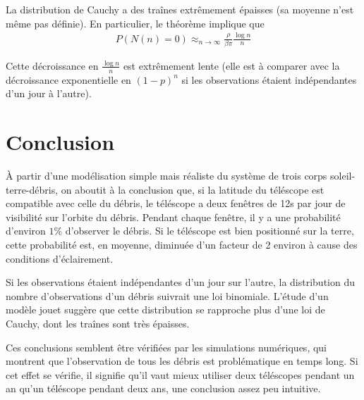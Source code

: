 \documentclass[a4paper,11pt]{article}
\numberwithin{section}{part}
\begin{document}
La distribution de Cauchy a des traînes extrêmement épaisses (sa
moyenne n'est même pas définie). En particulier, le théorème implique
que
\begin{align}
  P(N(n) = 0) \approx_{n\to\infty} \frac {\rho}{\beta \pi}\frac{\log n}{n}
\end{align}

Cette décroissance en $\frac {\log n} n$ est extrêmement lente (elle
est à comparer avec la décroissance exponentielle en $(1-p)^{n}$ si
les observations étaient indépendantes d'un jour à l'autre).





\section{Conclusion}
À partir d'une modélisation simple mais réaliste du système de trois
corps soleil-terre-débris, on aboutit à la conclusion que, si la
latitude du téléscope est compatible avec celle du débris, le
téléscope a deux fenêtres de 12s par jour de visibilité sur l'orbite
du débris. Pendant chaque fenêtre, il y a une probabilité d'environ
$1\%$ d'observer le débris. Si le téléscope est bien positionné sur la
terre, cette probabilité est, en moyenne, diminuée d'un facteur de 2
environ à cause des conditions d'éclairement.

Si les observations étaient indépendantes d'un jour sur l'autre, la
distribution du nombre d'observations d'un débris suivrait une loi
binomiale. L'étude d'un modèle jouet suggère que cette distribution se
rapproche plus d'une loi de Cauchy, dont les traînes sont très
épaisses.

Ces conclusions semblent être vérifiées par les simulations
numériques, qui montrent que l'observation de tous les débris est
problématique en temps long. Si cet effet se vérifie, il signifie
qu'il vaut mieux utiliser deux téléscopes pendant un an qu'un
téléscope pendant deux ans, une conclusion assez peu intuitive.
\end{document}
